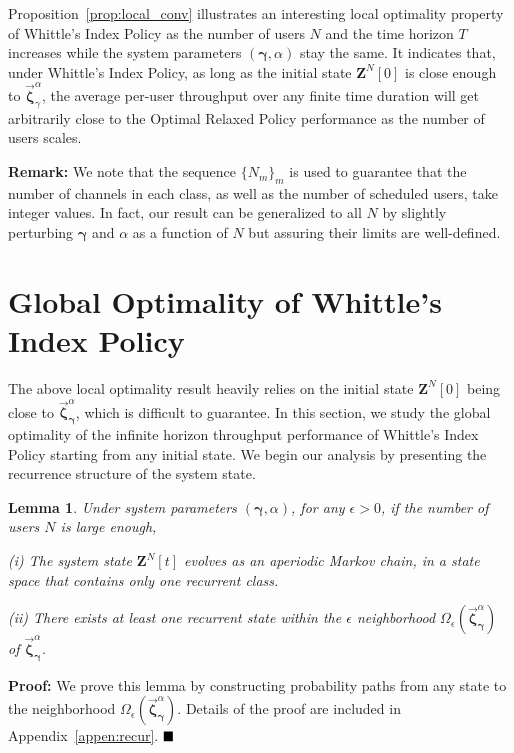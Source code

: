 \documentclass[11pt,twocolumn]{IEEEtran}
\newtheorem{lemma}{Lemma}
\begin{document}
Proposition~\ref{prop:local_conv} illustrates an interesting local
optimality property of Whittle's Index Policy as the number of users $N$
and the time horizon $T$ increases while the system parameters
$(\bm \gamma, \alpha)$ stay the same. It indicates that, under
Whittle's Index Policy, as long as the initial state ${\bm Z}^N[0]$
is close enough to $\vec{\bm \zeta}^{\alpha}_{\gamma}$, the average
per-user throughput over any finite time duration will get
arbitrarily close to the Optimal Relaxed Policy performance as the
number of users scales. \vspace{3pt}



\noindent \textbf{Remark: } We note that the sequence $\{N_m\}_m$ is
used to guarantee that the number of channels in each class, as well
as the number of scheduled users, take integer values. In fact, our
result can be generalized to all $N$ by slightly perturbing $\bm
\gamma$ and $\alpha$ as a function of $N$ but assuring their limits
are well-defined.

\section{Global Optimality of Whittle's Index Policy}
\label{sec:global}
The above local optimality result heavily relies on the initial
state ${\bm Z}^N[0]$ being close to $\vec{\bm \zeta}^{\alpha}_{\bm
\gamma}$, which is difficult to guarantee. In this section, we study
the global optimality of the infinite horizon throughput performance
of Whittle's Index Policy starting from any initial state. We begin
our analysis by presenting the recurrence structure of the system state.

\begin{lemma}
\label{lemma:recur}
Under system parameters $(\bm \gamma, \alpha)$, for any $\epsilon>0$, if the number of users $N$ is large enough, 

\noindent(i) The system state ${\bm Z}^N[t]$ evolves as an aperiodic
Markov chain, in a state space that contains only one recurrent
class.

\noindent(ii) There exists at least one recurrent state within the
$\epsilon$ neighborhood $\Omega_{\epsilon}(\vec{\bm
\zeta}^{\alpha}_{\bm \gamma})$ of $\vec{\bm \zeta}^{\alpha}_{\bm
\gamma}$.
\end{lemma}

\noindent \textbf{Proof:}  We prove this lemma by constructing probability paths from any
state to the neighborhood $\Omega_{\epsilon}(\vec{\bm
\zeta}^{\alpha}_{\bm \gamma})$. Details of the proof are included in Appendix~\ref{appen:recur}. $\hfill \blacksquare$
\vspace{4pt}
\end{document}
